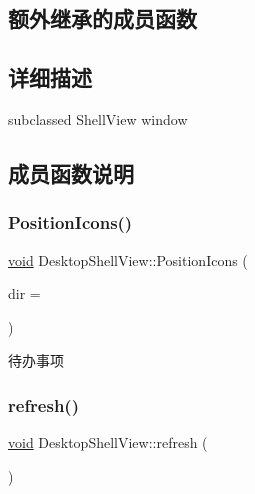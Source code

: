 \subsection*{额外继承的成员函数}


\subsection{详细描述}
subclassed Shell\+View window 

\subsection{成员函数说明}
\mbox{\label{struct_desktop_shell_view_a8899b937d203213479596725802692ac}} 
\subsubsection{\texorpdfstring{Position\+Icons()}{PositionIcons()}}
{\footnotesize\ttfamily \hyperlink{interfacevoid}{void} Desktop\+Shell\+View\+::\+Position\+Icons (\begin{DoxyParamCaption}\item[{int}]{dir = {} }\end{DoxyParamCaption})\hspace{0.3cm}{\ttfamily [protected]}}

\begin{DoxyRefDesc}{待办事项}
\item[\hyperlink{todo__todo000013}{待办事项}]\end{DoxyRefDesc}
\mbox{\label{struct_desktop_shell_view_a4d66e2c55895559db066f9c21de699c0}} 
\subsubsection{\texorpdfstring{refresh()}{refresh()}}
{\footnotesize\ttfamily \hyperlink{interfacevoid}{void} Desktop\+Shell\+View\+::refresh (\begin{DoxyParamCaption}{ }\end{DoxyParamCaption})\hspace{0.3cm}{\ttfamily [protected]}}

